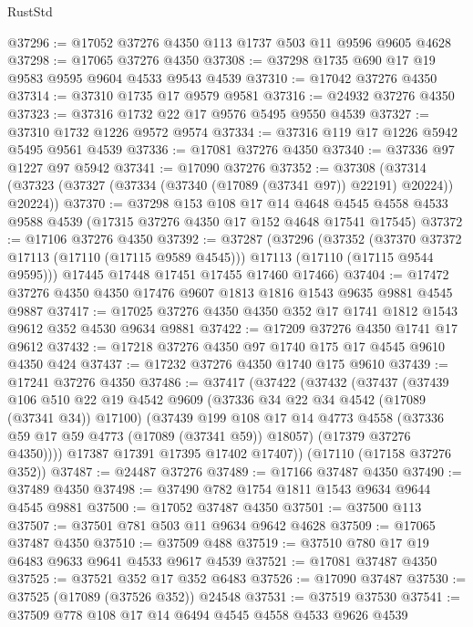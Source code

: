 \begin{lexlean}{RustStd}
\begin{coremodule}
@37296 := @17052 @37276 @4350 @113 @1737 @503 @11 @9596 @9605 @4628
@37298 := @17065 @37276 @4350
@37308 := @37298 @1735 @690 @17 @19 @9583 @9595 @9604 @4533 @9543 @4539
@37310 := @17042 @37276 @4350
@37314 := @37310 @1735 @17 @9579 @9581
@37316 := @24932 @37276 @4350
@37323 := @37316 @1732 @22 @17 @9576 @5495 @9550 @4539
@37327 := @37310 @1732 @1226 @9572 @9574
@37334 := @37316 @119 @17 @1226 @5942 @5495 @9561 @4539
@37336 := @17081 @37276 @4350
@37340 := @37336 @97 @1227 @97 @5942
@37341 := @17090 @37276
@37352 := @37308
    (@37314 (@37323 (@37327 (@37334 (@37340 (@17089 (@37341 @97)) @22191) @20224)) @20224))
@37370 := @37298
    @153
    @108
    @17
    @14
    @4648
    @4545
    @4558
    @4533
    @9588
    @4539
    (@17315 @37276 @4350 @17 @152 @4648 @17541 @17545)
@37372 := @17106 @37276 @4350
@37392 := @37287
    (@37296
      (@37352
        (@37370 @37372 @17113 (@17110 (@17115 @9589 @4545)))
        @17113
        (@17110 (@17115 @9544 @9595)))
      @17445
      @17448
      @17451
      @17455
      @17460
      @17466)
@37404 := @17472 @37276 @4350 @4350 @17476 @9607 @1813 @1816 @1543 @9635 @9881 @4545 @9887
@37417 := @17025 @37276 @4350 @4350 @352 @17 @1741 @1812 @1543 @9612 @352 @4530 @9634 @9881
@37422 := @17209 @37276 @4350 @1741 @17 @9612
@37432 := @17218 @37276 @4350 @97 @1740 @175 @17 @4545 @9610 @4350 @424
@37437 := @17232 @37276 @4350 @1740 @175 @9610
@37439 := @17241 @37276 @4350
@37486 := @37417
    (@37422
      (@37432
        (@37437
          (@37439
            @106
            @510
            @22
            @19
            @4542
            @9609
            (@37336 @34 @22 @34 @4542 (@17089 (@37341 @34)) @17100)
            (@37439
              @199
              @108
              @17
              @14
              @4773
              @4558
              (@37336 @59 @17 @59 @4773 (@17089 (@37341 @59)) @18057)
              (@17379 @37276 @4350))))
        @17387
        @17391
        @17395
        @17402
        @17407))
    (@17110 (@17158 @37276 @352))
@37487 := @24487 @37276
@37489 := @17166 @37487 @4350
@37490 := @37489 @4350
@37498 := @37490 @782 @1754 @1811 @1543 @9634 @9644 @4545 @9881
@37500 := @17052 @37487 @4350
@37501 := @37500 @113
@37507 := @37501 @781 @503 @11 @9634 @9642 @4628
@37509 := @17065 @37487 @4350
@37510 := @37509 @488
@37519 := @37510 @780 @17 @19 @6483 @9633 @9641 @4533 @9617 @4539
@37521 := @17081 @37487 @4350
@37525 := @37521 @352 @17 @352 @6483
@37526 := @17090 @37487
@37530 := @37525 (@17089 (@37526 @352)) @24548
@37531 := @37519 @37530
@37541 := @37509 @778 @108 @17 @14 @6494 @4545 @4558 @4533 @9626 @4539

\end{coremodule}
\end{lexlean}

